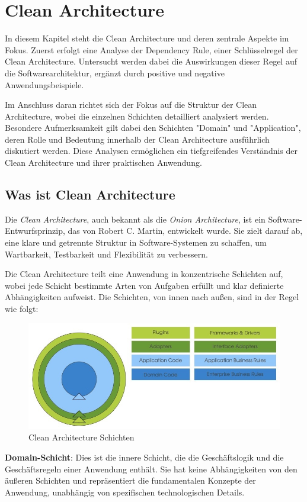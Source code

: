 \chapter{Clean Architecture}
In diesem Kapitel steht die Clean Architecture und deren zentrale Aspekte im Fokus. Zuerst erfolgt eine Analyse der Dependency Rule, einer Schlüsselregel der Clean Architecture. Untersucht werden dabei die Auswirkungen dieser Regel auf die Softwarearchitektur, ergänzt durch positive und negative Anwendungsbeispiele.

Im Anschluss daran richtet sich der Fokus auf die Struktur der Clean Architecture, wobei die einzelnen Schichten detailliert analysiert werden. Besondere Aufmerksamkeit gilt dabei den Schichten "Domain" und "Application", deren Rolle und Bedeutung innerhalb der Clean Architecture ausführlich diskutiert werden. Diese Analysen ermöglichen ein tiefgreifendes Verständnis der Clean Architecture und ihrer praktischen Anwendung.
\section{Was ist Clean Architecture}
Die \textit{Clean Architecture}, auch bekannt als die \textit{Onion Architecture}, ist ein Software-Entwurfsprinzip, das von Robert C. Martin, entwickelt wurde. Sie zielt darauf ab, eine klare und getrennte Struktur in Software-Systemen zu schaffen, um Wartbarkeit, Testbarkeit und Flexibilität zu verbessern.

Die Clean Architecture teilt eine Anwendung in konzentrische Schichten auf, wobei jede Schicht bestimmte Arten von Aufgaben erfüllt und klar definierte Abhängigkeiten aufweist. Die Schichten, von innen nach außen, sind in der Regel wie folgt:

\begin{figure}[ht]
    \includegraphics[width=1\textwidth]{Bilder/clean-architecture.jpeg}
    \caption{Clean Architecture Schichten}
    \label{fig:clean-architecture}
\end{figure}
\newpage
\textbf{Domain-Schicht}: Dies ist die innere Schicht, die die Geschäftslogik und die Geschäftsregeln einer Anwendung enthält. Sie hat keine Abhängigkeiten von den äußeren Schichten und repräsentiert die fundamentalen Konzepte der Anwendung, unabhängig von spezifischen technologischen Details.\\

